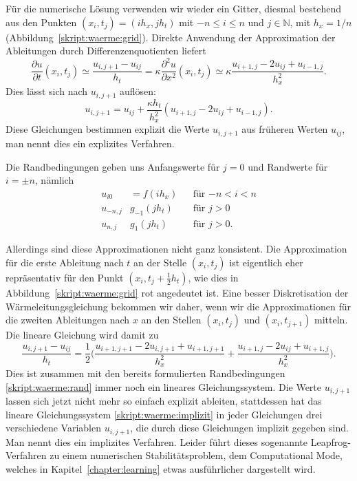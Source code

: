 Für die numerische Lösung verwenden wir wieder ein Gitter, diesmal bestehend
aus den Punkten $(x_i, t_j)=(ih_x, jh_t)$ mit $-n \le i \le n$ und
$j\in\mathbb N$, mit $h_x=1/n$ (Abbildung~\ref{skript:waerme:grid}).
Direkte Anwendung der Approximation der Ableitungen durch
Differenzenquotienten liefert
\begin{equation}
\frac{\partial u}{\partial t}(x_i,t_j)
\simeq
\frac{u_{i,j+1}-u_{ij}}{h_t}
=
\kappa
\frac{\partial^2u}{\partial x^2}(x_i,t_j)
\simeq
\kappa
\frac{u_{i+1,j}-2u_{ij}+u_{i-1,j}}{h_x^2}.
\end{equation}
Dies lässt sich nach $u_{i,j+1}$ auflösen:
\[
u_{i,j+1}
=
u_{ij}
+
\frac{\kappa h_t}{h_x^2} (u_{i+1,j}-2u_{ij}+u_{i-1,j}).
\]
Diese Gleichungen bestimmen explizit die Werte $u_{i,j+1}$ aus früheren Werten
$u_{ij}$, man nennt dies ein explizites Verfahren.

Die Randbedingungen geben uns Anfangswerte für $j=0$ und Randwerte
für $i=\pm n$, nämlich
\begin{equation}
\begin{aligned}
u_{i0} &= f(ih_x)&&\text{für $-n<i<n$}\\
u_{-n,j} & g_{-1}(jh_t)&&\text{für $j>0$}\\
u_{n,j} & g_{1}(jh_t)&&\text{für $j>0$.}
\end{aligned}
\label{skript:waerme:rand}
\end{equation}

Allerdings sind diese Approximationen nicht ganz konsistent.
Die Approximation für die erste Ableitung nach $t$ an der Stelle
$(x_i,t_j)$ ist eigentlich eher repräsentativ für den Punkt
$(x_i,t_j+\frac12h_t)$, wie dies in Abbildung~\ref{skript:waerme:grid}
{\color{red}rot}
angedeutet ist.
Eine besser Diskretisation der Wärmeleitungsgleichung bekommen wir daher,
wenn wir die Approximationen für die zweiten Ableitungen nach $x$ an
den Stellen $(x_i,t_j)$  und $(x_i,t_{j+1})$ mitteln. 
Die lineare Gleichung wird damit zu
\begin{equation}
\frac{u_{i,j+1}-u_{ij}}{h_t}
=
\frac12\biggl(
\frac{u_{i+1,j+1}-2u_{i,j+1}+u_{i+1,j+1}}{h_x^2}
+
\frac{u_{i+1,j}-2u_{ij}+u_{i+1,j}}{h_x^2}
\biggr).
\label{skript:waerme:implizit}
\end{equation}
Dies ist zusammen mit den bereits formulierten Randbedingungen
\eqref{skript:waerme:rand}
immer noch ein lineares Gleichungssystem.
Die Werte $u_{i,j+1}$ lassen sich jetzt nicht mehr so einfach
explizit ableiten, stattdessen hat das lineare Gleichungssystem
\eqref{skript:waerme:implizit}
in jeder Gleichungen drei verschiedene Variablen $u_{i,j+1}$,
die durch diese Gleichungen implizit gegeben sind.
Man nennt dies ein implizites Verfahren.
Leider führt dieses sogenannte Leapfrog-Verfahren zu einem numerischen
Stabilitätsproblem, dem Computational Mode, welches in
Kapitel~\ref{chapter:learning} etwas ausführlicher dargestellt wird.

